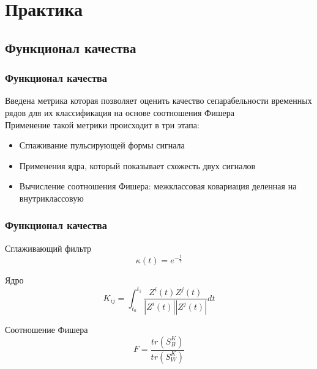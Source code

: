 \documentclass{beamer}
\begin{document}
\section{Практика}
\subsection{Функционал качества}

\begin{frame}
\frametitle{Функционал качества}
Введена метрика которая позволяет оценить качество сепарабельности временных рядов для их классификация на основе соотношения Фишера\\
Применение такой метрики происходит в три этапа:

\begin{itemize}
\item Сглаживание пульсирующей формы сигнала
\item Применения ядра, который показывает схожесть двух сигналов
\item Вычисление соотношения Фишера: межклассовая ковариация деленная на внутриклассовую
\end{itemize}

\end{frame}

\begin{frame}
\frametitle{Функционал качества}
\begin{block}{Сглаживающий фильтр}
	\begin{equation}
		\kappa(t)=e^{-\frac{t}{\tau}}
	\end{equation}
\end{block}

\begin{block}{Ядро}
	\begin{equation}
		K_{ij} = \int_{t_{0}}^{t_{1}} \frac{Z^{i}(t)Z^{j}(t)}{|Z^i(t)||Z^j(t)|}dt
	\end{equation}
\end{block}
\begin{block}{Соотношение Фишера}
	\begin{equation}
		F=\frac{tr(S_{B}^{K})}{tr(S_{W}^{K})}
	\end{equation}
\end{block}

\end{frame}
\end{document}
